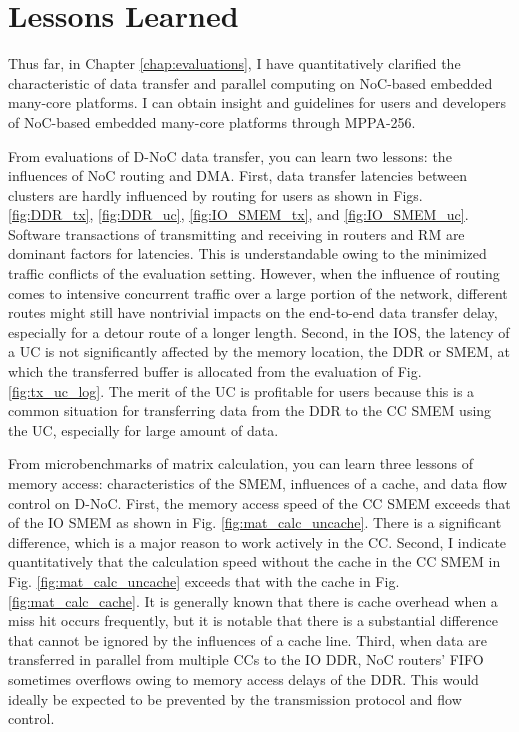 \section{Lessons Learned}
\label{sec:lessons}
Thus far, in Chapter \ref{chap:evaluations}, I have quantitatively clarified the characteristic of data transfer and parallel computing on NoC-based embedded many-core platforms.
I can obtain insight and guidelines for users and developers of NoC-based embedded many-core platforms through MPPA-256.

From evaluations of D-NoC data transfer, you can learn two lessons: the influences of NoC routing and DMA.
First, data transfer latencies between clusters are hardly influenced by routing for users as shown in Figs. \ref{fig:DDR_tx}, \ref{fig:DDR_uc}, \ref{fig:IO_SMEM_tx}, and \ref{fig:IO_SMEM_uc}.
Software transactions of transmitting and receiving in routers and RM are dominant factors for latencies.
This is understandable owing to the minimized traffic conflicts of the evaluation setting.
However, when the influence of routing comes to intensive concurrent traffic over a large portion of the network, different routes might still have nontrivial impacts on the end-to-end data transfer delay, especially for a detour route of a longer length.
Second, in the IOS, the latency of a UC is not significantly affected by the memory location, the DDR or SMEM, at which the transferred buffer is allocated from the evaluation of Fig. \ref{fig:tx_uc_log}.
The merit of the UC is profitable for users because this is a common situation for transferring data from the DDR to the CC SMEM using the UC, especially for large amount of data.

From microbenchmarks of matrix calculation, you can learn three lessons of memory access: characteristics of the SMEM, influences of a cache, and data flow control on D-NoC.
First, the memory access speed of the CC SMEM exceeds that of the IO SMEM as shown in Fig. \ref{fig:mat_calc_uncache}.
There is a significant difference, which is a major reason to work actively in the CC.
Second, I indicate quantitatively that the calculation speed without the cache in the CC SMEM in Fig. \ref{fig:mat_calc_uncache} exceeds that with the cache in Fig. \ref{fig:mat_calc_cache}.
It is generally known that there is cache overhead when a miss hit occurs frequently, but it is notable that there is a substantial difference that cannot be ignored by the influences of a cache line.
Third, when data are transferred in parallel from multiple CCs to the IO DDR, NoC routers' FIFO sometimes overflows owing to memory access delays of the DDR.
This would ideally be expected to be prevented by the transmission protocol and flow control.

